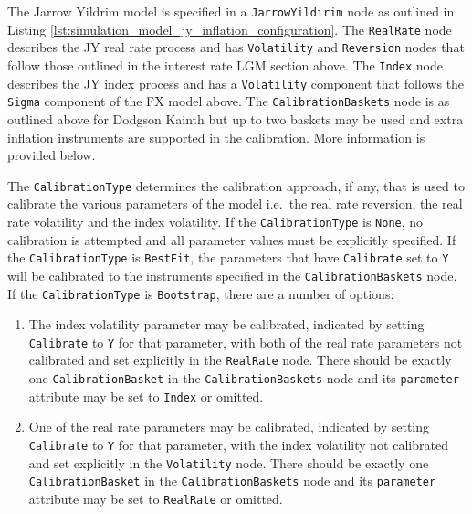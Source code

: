 \documentclass[12pt, a4paper]{article}
\begin{document}
{The Jarrow Yildrim model is specified in a \lstinline!JarrowYildirim! node as outlined in Listing \ref{lst:simulation_model_jy_inflation_configuration}. The \lstinline!RealRate! 
node describes the JY real rate process and has \lstinline!Volatility! and \lstinline!Reversion! nodes that follow those outlined in the interest rate LGM section above. The  
\lstinline!Index! node describes the JY index process and has a \lstinline!Volatility! component that follows the \lstinline!Sigma! component of the FX model above. The 
\lstinline!CalibrationBaskets! node is as outlined above for Dodgson Kainth but up to two baskets may be used and extra inflation instruments are supported in the calibration. More 
information is provided below.

The \lstinline!CalibrationType! determines the calibration approach, if any, that is used to calibrate the various parameters of the model i.e.\ the real rate reversion, the real 
rate volatility and the index volatility. If the \lstinline!CalibrationType! is \lstinline!None!, no calibration is attempted and all parameter values must be explicitly specified.
If the \lstinline!CalibrationType! is \lstinline!BestFit!, the parameters that have \lstinline!Calibrate! set to \lstinline!Y! will be calibrated to the instruments specified in 
the \lstinline!CalibrationBaskets! node. If the \lstinline!CalibrationType! is \lstinline!Bootstrap!, there are a number of options:

\begin{enumerate}
\item
The index volatility parameter may be calibrated, indicated by setting \lstinline!Calibrate! to \lstinline!Y! for that parameter, with both of the real rate parameters not calibrated 
and set explicitly in the \lstinline!RealRate! node. There should be exactly one \lstinline!CalibrationBasket! in the \lstinline!CalibrationBaskets! node and its \lstinline!parameter! 
attribute may be set to \lstinline!Index! or omitted.

\item
One of the real rate parameters may be calibrated, indicated by setting \lstinline!Calibrate! to \lstinline!Y! for that parameter, with the index volatility not calibrated and set 
explicitly in the \lstinline!Volatility! node. There should be exactly one \lstinline!CalibrationBasket! in the \lstinline!CalibrationBaskets! node and its \lstinline!parameter! 
attribute may be set to \lstinline!RealRate! or omitted.


\end{enumerate}}
\end{document}
